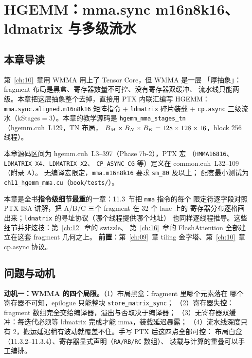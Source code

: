 \chapter{HGEMM：mma.sync m16n8k16、ldmatrix 与多级流水}\label{ch:11}

\section{本章导读}

第~\ref{ch:10}~章用 WMMA 用上了 Tensor Core，但 WMMA 是一层
「厚抽象」：fragment 布局是黑盒、寄存器数量不可控、没有寄存器双缓冲、
流水线只能两级。本章把这层抽象整个去掉，直接用 PTX 内联汇编写
HGEMM：\texttt{mma.\allowbreak{}sync.\allowbreak{}aligned.\allowbreak{}m16n8k16} 矩阵指令 + \texttt{ldmatrix}
碎片装载 + \texttt{cp.async} 三级流水（kStages$=$3）。本章的教学源码是
\texttt{hgemm\_\allowbreak{}mma\_\allowbreak{}stages\_\allowbreak{}tn}（hgemm.cuh~L129，TN 布局，
$B\sb M\times B\sb N\times B\sb K = 128\times128\times16$，block 256 线程）。

本章源码区间为 hgemm.cuh~L3--397（Phase 7b-2），PTX 宏
（\texttt{HMMA16816}、\texttt{LDMATRIX\_X4}、\texttt{LDMATRIX\_X2}、
\texttt{CP\_ASYNC\_CG} 等）定义在 common.cuh~L32--109（附录 A）。
无编译宏限定，\texttt{mma.\allowbreak{}m16n8k16} 要求 \texttt{sm\_80} 及以上；
配套最小测试为 \texttt{ch11\_\allowbreak{}hgemm\_\allowbreak{}mma.\allowbreak{}cu}（\texttt{book/tests/}）。

本章是全书\textbf{指令级细节最重}的一章：11.3~节把 \texttt{mma} 指令的每个
限定符逐字段对照 PTX ISA 讲解，把 A/B/C 三个 fragment 在 32 个 lane 上的
寄存器分布逐格画出来；\texttt{ldmatrix} 的寻址协议（哪个线程提供哪个地址）
也同样逐线程推导。这些细节并非炫技：第~\ref{ch:12}~章的 swizzle、
第~\ref{ch:16}~章的 FlashAttention 全部建立在这套 fragment 几何之上。
\textbf{前置}：第~\ref{ch:09}~章 tiling 金字塔、第~\ref{ch:10}~章 cp.async 协议。

\section{问题与动机}

\textbf{动机一：WMMA 的四个局限。}（1）布局黑盒：fragment 里哪个元素落在
哪个寄存器不可知，epilogue 只能整块 \texttt{store\_\allowbreak{}matrix\_\allowbreak{}sync}；
（2）寄存器失控：fragment 数组完全交给编译器，溢出与否取决于编译器；
（3）无寄存器双缓冲：每迭代必须等 ldmatrix 完成才能 mma，装载延迟暴露；
（4）流水线深度只有 2，搬运延迟稍有波动就覆盖不住。手写 PTX 后这四点全部可控：
布局白盒（11.3.2--11.3.4）、寄存器显式声明（\texttt{RA/RB/RC} 数组）、
装载与计算的重叠可以手工编排。

